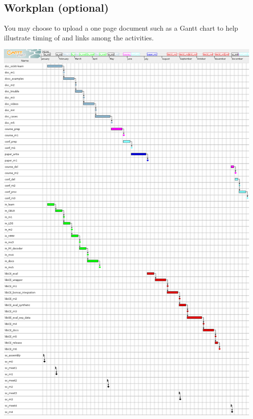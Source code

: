\documentclass[12pt]{article}
\newenvironment{instruction}{%
    \begin{tcolorbox}[colback=red!5,colframe=red,title=Instruction]%
}{%
    \end{tcolorbox}%
}
\begin{document}


\subsection{Workplan (optional)}

\begin{instruction}
You may choose to upload a one page document such as a Gantt chart to help illustrate timing of and links among the activities.
\end{instruction}

\begin{center}
    \includegraphics[width=6.5in]{figures/ganttChart1.png}
\end{center}

\pagebreak
\end{document}
